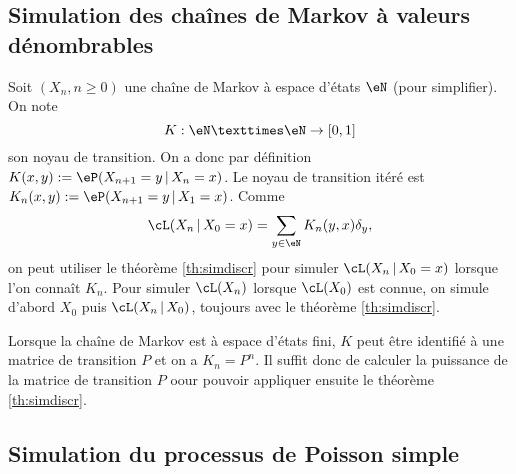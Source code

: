 %
%
%

\subsection{Simulation des chaînes de Markov à valeurs dénombrables}

Soit $(X_n,n\geq 0)$ une chaîne de Markov à espace d'états $\eN$ (pour
simplifier). On note
$$K:\eN× \eN\to[0,1]$$
son noyau de transition. On a donc par définition
$K(x,y):=\eP(X_{n+1}=y\,|\,X_n=x)$. Le noyau de transition itéré est
$K_n(x,y):=\eP(X_{n+1}=y\,|\,X_1=x)$. Comme
$$\cL(X_n\,|\,X_0=x)=\sum_{y\in\eN}K_n(y,x)\delta_y,$$
on peut utiliser le théorème
\ref{th:simdiscr} pour simuler $\cL(X_n\,|\,X_0=x)$ lorsque l'on connaît
$K_n$. Pour simuler $\cL(X_n)$ lorsque $\cL(X_0)$ est connue, on simule
d'abord $X_0$ puis $\cL(X_n\,|\,X_0)$, toujours avec le théorème
\ref{th:simdiscr}.

Lorsque la chaîne de Markov est à espace d'états fini, $K$ peut être identifié
à une matrice de transition $P$ et on a $K_n=P^n$. Il suffit donc de calculer
la puissance de la matrice de transition $P$ oour pouvoir appliquer
ensuite le théorème \ref{th:simdiscr}. 

\subsection{Simulation du processus de Poisson simple}

